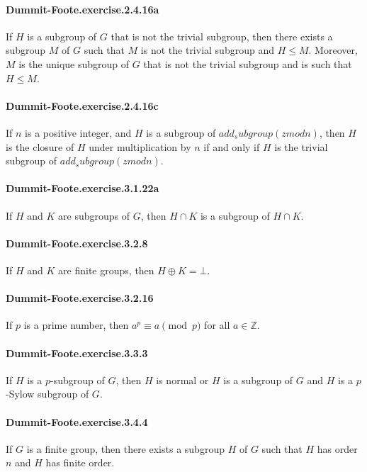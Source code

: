 \documentclass{article}
\begin{document}
\paragraph{Dummit-Foote.exercise.2.4.16a} If $H$ is a subgroup of $G$ that is not the trivial subgroup, then there exists a subgroup $M$ of $G$ such that $M$ is not the trivial subgroup and $H \leq M$. Moreover, $M$ is the unique subgroup of $G$ that is not the trivial subgroup and is such that $H \leq M$.

\paragraph{Dummit-Foote.exercise.2.4.16c} If $n$ is a positive integer, and $H$ is a subgroup of $add_subgroup (zmod n)$, then $H$ is the closure of $H$ under multiplication by $n$ if and only if $H$ is the trivial subgroup of $add_subgroup (zmod n)$.

\paragraph{Dummit-Foote.exercise.3.1.22a} If $H$ and $K$ are subgroups of $G$, then $H \cap K$ is a subgroup of $H \cap K$.

\paragraph{Dummit-Foote.exercise.3.2.8} If $H$ and $K$ are finite groups, then $H \oplus K = \bot$.

\paragraph{Dummit-Foote.exercise.3.2.16} If $p$ is a prime number, then $a^p \equiv a \pmod{p}$ for all $a \in \mathbb{Z}$.

\paragraph{Dummit-Foote.exercise.3.3.3} If $H$ is a $p$-subgroup of $G$, then $H$ is normal or $H$ is a subgroup of $G$ and $H$ is a $p$-Sylow subgroup of $G$.

\paragraph{Dummit-Foote.exercise.3.4.4} If $G$ is a finite group, then there exists a subgroup $H$ of $G$ such that $H$ has order $n$ and $H$ has finite order.
\end{document}
